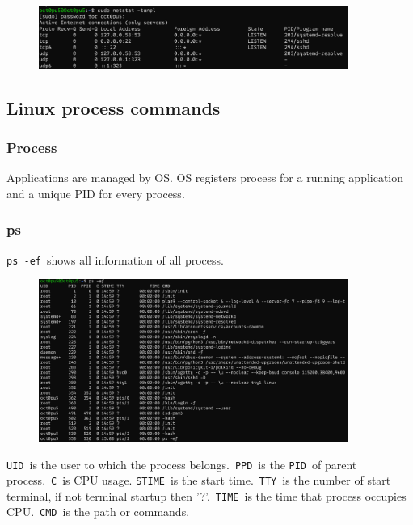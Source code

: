 \documentclass[12pt]{ctexart}
\begin{document}
\begin{figure}[H]
    \centering
    \includegraphics[width=0.9\textwidth,keepaspectratio]{assets/Linux/1.9 Linux network commands/5.png}
\end{figure}

\subsection{\textbf{Linux process commands}}

\subsubsection{\textbf{Process}}

Applications are managed by OS. OS registers process for a running
application and a unique PID for every process.

\subsubsection{\textbf{ps}}

\texttt{ps\ -ef}\ shows all information of all process.

\begin{figure}[H]
    \centering
    \includegraphics[width=0.9\textwidth,keepaspectratio]{assets/Linux/1.10 Linux process commands/1.png}
\end{figure}

\texttt{UID}\ is the user to which the process belongs.\ \texttt{PPD}\ is
the \texttt{PID}\ of parent process.\ \texttt{C}\ is CPU usage.
\texttt{STIME}\ is the start time.\ \texttt{TTY}\ is the number of start
terminal, if not terminal startup then '?'.\ \texttt{TIME}\ is the time
that process occupies CPU.\ \texttt{CMD}\ is the path or commands.
\end{document}
